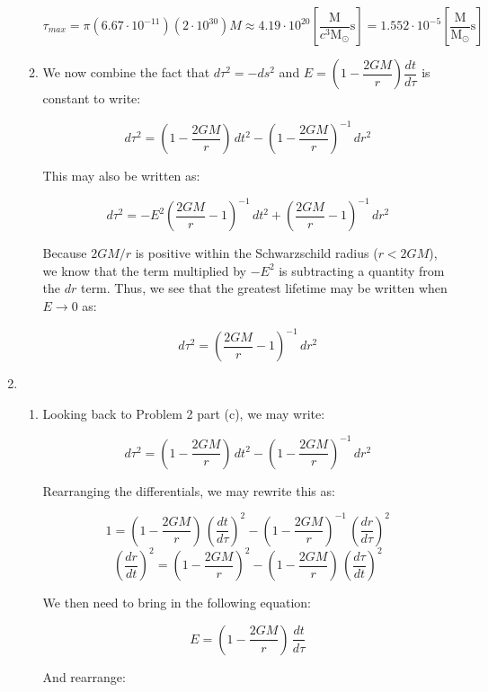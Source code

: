 \begin{enumerate}
\begin{enumerate}
        $$\boxed{\tau_{max}=\pi \left( 6.67\cdot10^{-11} \right)\left( 2\cdot10^{30} \right)M\approx 4.19\cdot10^{20}\left[ \frac{\text{M}}{c^3\text{M}_{\odot}}\si{\second} \right]=1.552\cdot10^{-5}\left[ \frac{\text{M}}{\text{M}_{\odot}}\si{\second} \right]}$$

      \item 

        We now combine the fact that $d\tau^2=-ds^2$ and $E=\left( 1-\dfrac{2GM}{r} \right)\dfrac{dt}{d\tau}$ is constant to write:

        $$d\tau^2=\left( 1-\frac{2GM}{r} \right)\,dt^2-\left( 1-\frac{2GM}{r} \right)^{-1}\,dr^2$$

        This may also be written as:

        $$d\tau^2=-E^2\left( \frac{2GM}{r}-1 \right)^{-1}\,dt^2+\left( \frac{2GM}{r}-1 \right)^{-1}\,dr^2$$

        Because $2GM/r$ is positive within the Schwarzschild radius ($r<2GM$), we know that the term multiplied by $-E^2$ is subtracting a quantity from the $dr$ term. Thus, we see that the greatest lifetime may be written when $E\to0$ as:

        $$\boxed{d\tau^2=\left( \frac{2GM}{r}-1 \right)^{-1}\,dr^2}$$

    \end{enumerate}

  \item

    \begin{enumerate}

      \item Looking back to Problem 2 part (c), we may write:

        $$d\tau^2=\left( 1-\frac{2GM}{r} \right)\,dt^2-\left( 1-\frac{2GM}{r} \right)^{-1}\,dr^2$$

        Rearranging the differentials, we may rewrite this as:

        $$1=\left( 1-\frac{2GM}{r} \right)\,\left(\frac{dt}{d\tau}\right)^2-\left( 1-\frac{2GM}{r} \right)^{-1}\,\left(\frac{dr}{d\tau}\right)^2$$
        $$\left( \frac{dr}{dt} \right)^2=\left( 1-\frac{2GM}{r} \right)^2-\left( 1-\frac{2GM}{r} \right)\,\left(\frac{d\tau}{dt}\right)^2$$

        We then need to bring in the following equation:

        $$E=\left( 1-\frac{2GM}{r} \right)\,\frac{dt}{d\tau}$$

        And rearrange:


\end{enumerate}
\end{enumerate}
